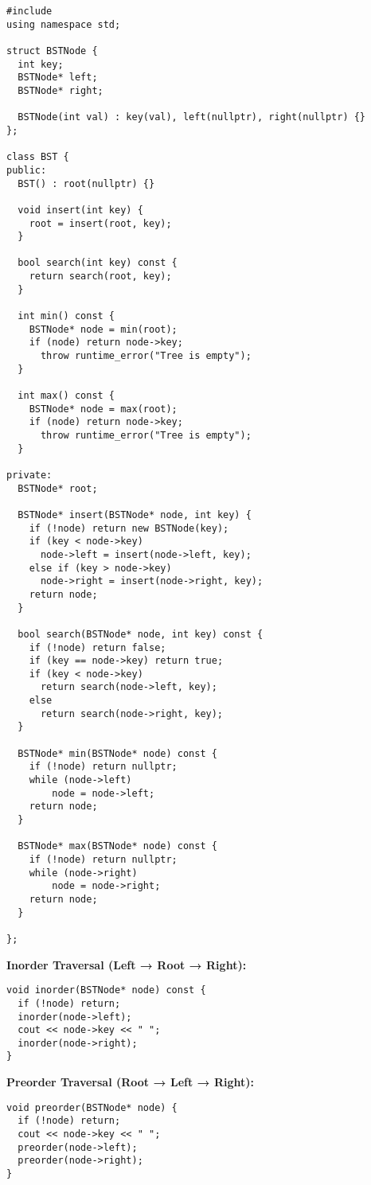 \documentclass{article}
\begin{document}
\begin{lstlisting}[style=cppstyle]
#include 
using namespace std;

struct BSTNode {
  int key;
  BSTNode* left;
  BSTNode* right;

  BSTNode(int val) : key(val), left(nullptr), right(nullptr) {}
};

class BST {
public:
  BST() : root(nullptr) {}

  void insert(int key) {
    root = insert(root, key);
  }

  bool search(int key) const {
    return search(root, key);
  }

  int min() const {
    BSTNode* node = min(root);
    if (node) return node->key;
      throw runtime_error("Tree is empty");
  }

  int max() const {
    BSTNode* node = max(root);
    if (node) return node->key;
      throw runtime_error("Tree is empty");
  }

private:
  BSTNode* root;

  BSTNode* insert(BSTNode* node, int key) {
    if (!node) return new BSTNode(key);
    if (key < node->key)
      node->left = insert(node->left, key);
    else if (key > node->key)
      node->right = insert(node->right, key);
    return node;
  }

  bool search(BSTNode* node, int key) const {
    if (!node) return false;
    if (key == node->key) return true;
    if (key < node->key)
      return search(node->left, key);
    else
      return search(node->right, key);
  }

  BSTNode* min(BSTNode* node) const {
    if (!node) return nullptr;
    while (node->left)
        node = node->left;
    return node;
  }

  BSTNode* max(BSTNode* node) const {
    if (!node) return nullptr;
    while (node->right)
        node = node->right;
    return node;
  }

};
\end{lstlisting}

\textbf{Inorder Traversal (Left → Root → Right):}
\begin{lstlisting}[style=cppstyle]
void inorder(BSTNode* node) const {
  if (!node) return;
  inorder(node->left);
  cout << node->key << " ";
  inorder(node->right);
}
\end{lstlisting}

\textbf{Preorder Traversal (Root → Left → Right):}
\begin{lstlisting}[style=cppstyle]
void preorder(BSTNode* node) {
  if (!node) return;
  cout << node->key << " ";
  preorder(node->left);
  preorder(node->right);
}
\end{lstlisting}
\end{document}
